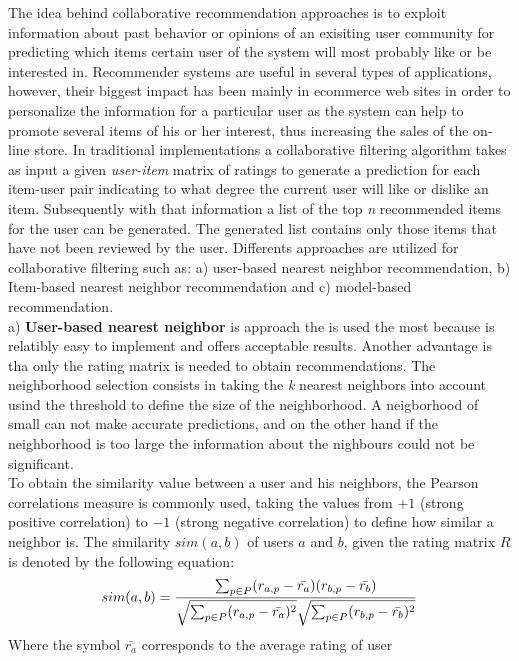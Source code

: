 The idea behind collaborative recommendation approaches is to exploit
information about past behavior or opinions of an exisiting user
community  for predicting which items certain user of the system will
most probably like or be interested in\cite{jannach2010recommender}. 
Recommender systems are useful in several types of  applications,
however, their biggest impact has been mainly in ecommerce  web sites
in order to personalize the information for a particular user as the
system can help to promote several items of his or her interest, thus
increasing the sales of the on-line store. In traditional
implementations a collaborative filtering algorithm takes as
input a given \textit{user-item} matrix of ratings to generate a
prediction for each item-user pair indicating to what degree the
current user will like or dislike an item. Subsequently with that
information a list of the top \textit{n} recommended items for the
user can be generated. The generated list contains only those items
that have not been reviewed by the user. Differents approaches are
utilized for collaborative filtering such as: a) user-based nearest 
neighbor recommendation, b) Item-based nearest neighbor 
recommendation and c) model-based recommendation.\\
a) \textbf{User-based nearest neighbor} is approach the is used the
most because is relatibly easy to implement and offers acceptable
results. Another advantage is tha only the rating matrix is needed to
obtain recommendations. The neighborhood selection consists in taking
the \textit{k}  nearest neighbors into account usind the threshold to
define the size of the neighborhood. A neigborhood of small can not
make accurate predictions, and on the other hand if the neighborhood
is too large the information about the nighbours could not be
significant.\\ To obtain the similarity value between a user and his
neighbors, the Pearson correlations measure is commonly used, taking
the values from $+1$ (strong positive correlation) to $-1$ (strong
negative correlation) to define how similar a neighbor is. The
similarity $sim(a,b)$ of users $a$ and $b$, given the rating matrix
$R$ is denoted by the following equation:
\begin{equation}\label{eq:pearson1}
\displaystyle sim(a,b) = {\sum_{p \in P}(r_{a,p} - 
\bar{r_a})(r_{b,p}- \bar{r_b}) 
\over \sqrt{\sum_{p \in P}(r_{a,p} - \bar{r_a})^2} 
\sqrt{\sum_{p \in P} 
(r_{b,p}- \bar{r_b})^2}}
\end{equation}
Where the symbol $\bar{r_a}$ corresponds to the average rating of user
